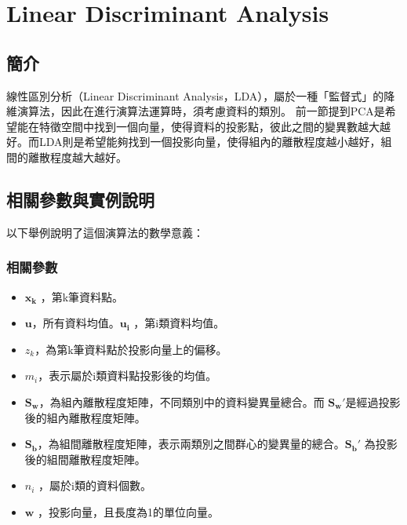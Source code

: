 \chapter{Linear Discriminant Analysis}
\label{chapter:lda}
\section{簡介}
\label{sec:LdaIntroduction}





線性區別分析（Linear Discriminant Analysis，LDA），屬於一種「監督式」的降維演算法，因此在進行演算法運算時，須考慮資料的類別。
前一節提到PCA是希望能在特徵空間中找到一個向量，使得資料的投影點，彼此之間的變異數越大越好。而LDA則是希望能夠找到一個投影向量，使得組內的離散程度越小越好，組間的離散程度越大越好。




\section{相關參數與實例說明}
以下舉例說明了這個演算法的數學意義：

\subsection{相關參數}

\begin{itemize}
	\item
	      \(\mathbf{x_k}\) ，第k筆資料點。
	\item
	      \(\mathbf{u}\)，所有資料均值。\(\mathbf{u_i}\) ，第i類資料均值。
	\item
		\(z_k\)，為第k筆資料點於投影向量上的偏移。
	\item
		\(m_i\)，表示屬於i類資料點投影後的均值。

	\item
	      \(\mathbf{S_w}\)，為組內離散程度矩陣，不同類別中的資料變異量總合。而 \(\mathbf{{S_w}'}\)是經過投影後的組內離散程度矩陣。
	\item
	      \(\mathbf{S_b}\)，為組間離散程度矩陣，表示兩類別之間群心的變異量的總合。\(\mathbf{{S_b}'}\) 為投影後的組間離散程度矩陣。
	      
	\item
	      \(n_i\) ，屬於i類的資料個數。
	\item
	      \(\mathbf{w}\) ，投影向量，且長度為1的單位向量。
\end{itemize}

